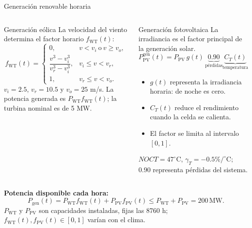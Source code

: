 \documentclass[aspectratio=169,11pt]{beamer}
\newcommand{\destacado}[1]{\textcolor{primary}{\textbf{#1}}}
\begin{document}
\begin{frame}{Generación renovable horaria}
  \begin{columns}[T,onlytextwidth]
      \begin{block}{Generación eólica}
        \scriptsize
        La velocidad del viento determina el factor horario $f_{\mathrm{WT}}(t)$:
        \[
          f_{\mathrm{WT}}(t)=
          \begin{cases}
            0, & v<v_i\ \text{o}\ v\geq v_o,\\
            \dfrac{v^3-v_i^3}{v_r^3-v_i^3},
            & v_i\leq v<v_r,\\
            1, & v_r\leq v<v_o.
          \end{cases}
        \]
        $v_i=2.5$, $v_r=10.5$ y $v_o=25$ m/s. La potencia generada es
        $P_{\mathrm{WT}}f_{\mathrm{WT}}(t)$; la turbina nominal es de 5 MW.
      \end{block}

      \begin{exampleblock}{Generación fotovoltaica}
        \scriptsize
        La irradiancia es el factor principal de la generación solar.\vspace{-0.04cm}
        \[
          P_{\mathrm{PV}}^{\mathrm{gen}}(t)=
          P_{\mathrm{PV}}\,g(t)\,\underbrace{0.90}_{\text{pérdidas}}
          \underbrace{C_T(t)}_{\text{temperatura}}
        \]
        \begin{itemize}
          \item $g(t)$ representa la irradiancia horaria: de noche es cero.
          \item $C_T(t)$ reduce el rendimiento cuando la celda se calienta.
          \item El factor se limita al intervalo $[0,1]$.
        \end{itemize}
        \vspace{-0.08cm}
        \scriptsize $NOCT=47^\circ$C, $\gamma_T=-0.5\%/^\circ$C$;$
        $0.90$ representa pérdidas del sistema.
      \end{exampleblock}
  \end{columns}

  \vspace{0.06cm}
  \centering
  \destacado{Potencia disponible cada hora:}
  \[
    P_{\mathrm{gen}}(t)=P_{\mathrm{WT}}f_{\mathrm{WT}}(t)+P_{\mathrm{PV}}f_{\mathrm{PV}}(t)
    \leq P_{\mathrm{WT}}+P_{\mathrm{PV}}=200\,\mathrm{MW}.
  \]
  {\scriptsize $P_{\mathrm{WT}}$ y $P_{\mathrm{PV}}$ son capacidades instaladas, fijas las 8760 h;
  $f_{\mathrm{WT}}(t),f_{\mathrm{PV}}(t)\in[0,1]$ varían con el clima.}
\end{frame}
\end{document}

